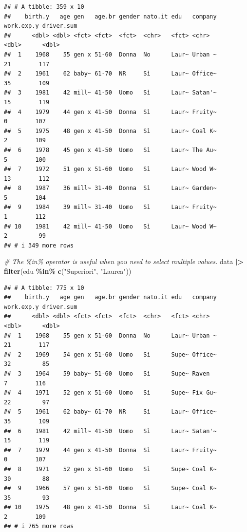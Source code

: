 \documentclass[
]{book}
\newenvironment{Shaded}{\begin{snugshade}}{\end{snugshade}}
\newcommand{\CommentTok}[1]{\textcolor[rgb]{0.56,0.35,0.01}{\textit{#1}}}
\newcommand{\FunctionTok}[1]{\textcolor[rgb]{0.13,0.29,0.53}{\textbf{#1}}}
\newcommand{\NormalTok}[1]{#1}
\newcommand{\SpecialCharTok}[1]{\textcolor[rgb]{0.81,0.36,0.00}{\textbf{#1}}}
\newcommand{\StringTok}[1]{\textcolor[rgb]{0.31,0.60,0.02}{#1}}
\begin{document}
\begin{verbatim}
## # A tibble: 359 x 10
##    birth.y   age gen   age.br gender nato.it edu   company work.exp.y driver.sum
##      <dbl> <dbl> <fct> <fct>  <fct>  <chr>   <fct> <chr>        <dbl>      <dbl>
##  1    1968    55 gen x 51-60  Donna  No      Laur~ Urban ~         21        117
##  2    1961    62 baby~ 61-70  NR     Sì      Laur~ Office~         35        109
##  3    1981    42 mill~ 41-50  Uomo   Sì      Laur~ Satan'~         15        119
##  4    1979    44 gen x 41-50  Donna  Sì      Laur~ Fruity~          0        107
##  5    1975    48 gen x 41-50  Donna  Sì      Laur~ Coal K~          2        109
##  6    1978    45 gen x 41-50  Uomo   Sì      Laur~ The Au~          5        100
##  7    1972    51 gen x 51-60  Uomo   Sì      Laur~ Wood W~         13        112
##  8    1987    36 mill~ 31-40  Donna  Sì      Laur~ Garden~          5        104
##  9    1984    39 mill~ 31-40  Uomo   Sì      Laur~ Fruity~          1        112
## 10    1981    42 mill~ 41-50  Uomo   Sì      Laur~ Wood W~          2         99
## # i 349 more rows
\end{verbatim}

\begin{Shaded}
\begin{Highlighting}[]
\CommentTok{\# The \%in\% operator is useful when you need to select multiple values.}
\NormalTok{data }\SpecialCharTok{|\textgreater{}} 
  \FunctionTok{filter}\NormalTok{(edu }\SpecialCharTok{\%in\%} \FunctionTok{c}\NormalTok{(}\StringTok{"Superiori"}\NormalTok{, }\StringTok{"Laurea"}\NormalTok{))}
\end{Highlighting}
\end{Shaded}

\begin{verbatim}
## # A tibble: 775 x 10
##    birth.y   age gen   age.br gender nato.it edu   company work.exp.y driver.sum
##      <dbl> <dbl> <fct> <fct>  <fct>  <chr>   <fct> <chr>        <dbl>      <dbl>
##  1    1968    55 gen x 51-60  Donna  No      Laur~ Urban ~         21        117
##  2    1969    54 gen x 51-60  Uomo   Sì      Supe~ Office~         32         85
##  3    1964    59 baby~ 51-60  Uomo   Sì      Supe~ Raven            7        116
##  4    1971    52 gen x 51-60  Uomo   Sì      Supe~ Fix Gu~         22         97
##  5    1961    62 baby~ 61-70  NR     Sì      Laur~ Office~         35        109
##  6    1981    42 mill~ 41-50  Uomo   Sì      Laur~ Satan'~         15        119
##  7    1979    44 gen x 41-50  Donna  Sì      Laur~ Fruity~          0        107
##  8    1971    52 gen x 51-60  Uomo   Sì      Supe~ Coal K~         30         88
##  9    1966    57 gen x 51-60  Uomo   Sì      Supe~ Coal K~         35         93
## 10    1975    48 gen x 41-50  Donna  Sì      Laur~ Coal K~          2        109
## # i 765 more rows
\end{verbatim}
\end{document}
